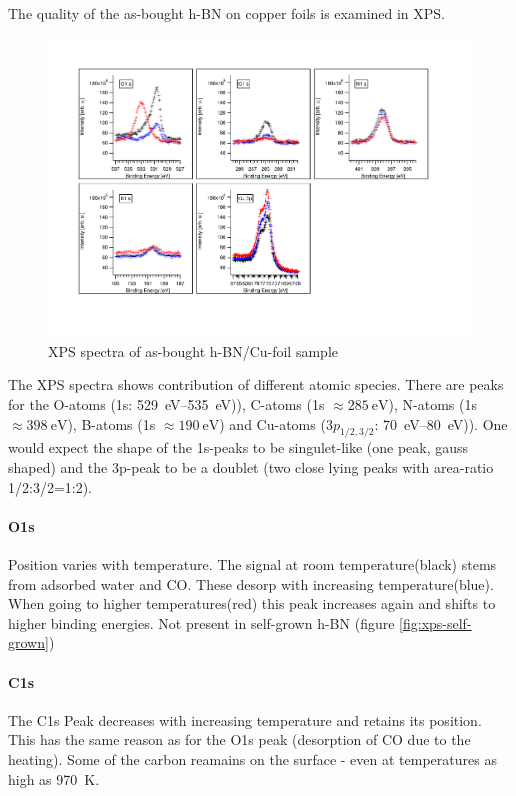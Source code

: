 The quality of the as-bought h-BN on copper foils\cite{_graphene_2014} is examined in XPS.
\begin{figure}
\includegraphics[angle=90,width=1.2\textwidth]{./images/XPS-spectra-as-bought.pdf}
\caption{XPS spectra of as-bought h-BN/Cu-foil sample\cite{_graphene_2014}}
\end{figure}
The XPS spectra shows contribution of different atomic species. There are peaks for the O-atoms (1s: \SIrange{529}{535}{\eV})), C-atoms (1s $\approx \SI{285}{\eV}$), N-atoms (1s $\approx \SI{398}{\eV}$), B-atoms (1s $\approx \SI{190}{\eV}$) and Cu-atoms ($3p_{1/2,3/2}$: \SIrange{70}{80}{\eV})). One would expect the shape of the 1s-peaks to be singulet-like (one peak, gauss shaped) and the 3p-peak to be a doublet (two close lying peaks with area-ratio 1/2:3/2=1:2).

\paragraph{O1s}
Position varies with temperature. The signal at room temperature(black) stems from adsorbed water and CO. These desorp with increasing temperature(blue). When going to higher temperatures(red) this peak increases again and shifts to higher binding energies. Not present in self-grown h-BN (figure \ref{fig:xps-self-grown})

\paragraph{C1s}
The C1s Peak decreases with increasing temperature and retains its position. This has the same  reason as for the O1s peak (desorption of CO due to the heating). Some of the carbon reamains on the surface - even at temperatures as high as \SI{970}{\K}.


